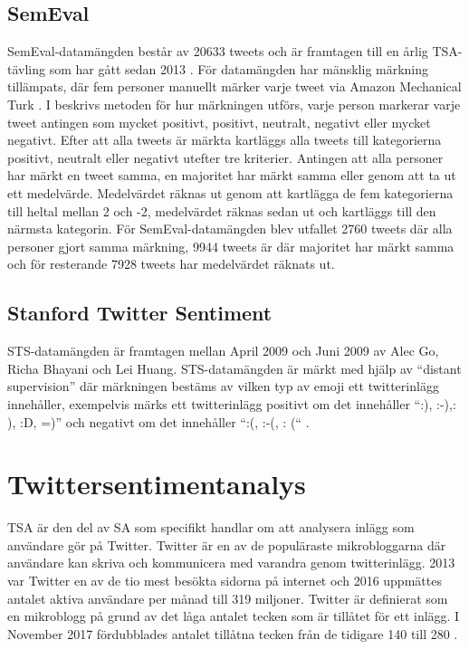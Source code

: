 \documentclass{kaumasters} %
\begin{document}
\subsection{SemEval} \label{DSse}
SemEval-datamängden består av 20633 tweets och är framtagen till en årlig TSA-tävling som har gått sedan 2013 \cite{SemEval:002}. 
För datamängden har mänsklig märkning tillämpats, där fem personer manuellt märker varje tweet via Amazon Mechanical Turk \cite{SemEval:003}.
I \cite{SemEval:004} beskrivs metoden för hur märkningen utförs, varje person markerar varje tweet antingen som mycket positivt, positivt, neutralt, negativt eller mycket negativt. Efter att alla tweets är märkta kartläggs alla tweets till kategorierna positivt, neutralt eller negativt utefter tre kriterier. Antingen att alla personer har märkt en tweet samma, en majoritet har märkt samma eller genom att ta ut ett medelvärde. Medelvärdet räknas ut genom att kartlägga de fem kategorierna till heltal mellan 2 och -2, medelvärdet räknas sedan ut och kartläggs till den närmsta kategorin. För SemEval-datamängden blev utfallet 2760 tweets där alla personer gjort samma märkning, 9944 tweets är där majoritet har märkt samma och för resterande 7928 tweets har medelvärdet räknats ut. 

\subsection{Stanford Twitter Sentiment} \label{DSsts}
STS-datamängden är framtagen mellan April 2009 och Juni 2009 av Alec Go, Richa Bhayani och Lei Huang. STS-datamängden är märkt med hjälp av “distant supervision” där märkningen bestäms av vilken typ av emoji \cite{wiki:010} ett twitterinlägg innehåller, exempelvis märks ett twitterinlägg positivt om det innehåller “:), :-),: ), :D, =)” och negativt om det innehåller “:(, :-(, : (“ \cite{sts:001}. 

\section{Twittersentimentanalys} \label{TSA}
TSA är den del av SA som specifikt handlar om att analysera inlägg som användare gör på Twitter. Twitter är en av de populäraste mikrobloggarna där användare kan skriva och kommunicera med varandra genom twitterinlägg. 2013 var Twitter en av de tio mest besökta sidorna på internet och 2016 uppmättes antalet aktiva användare per månad till 319 miljoner. Twitter är definierat som en mikroblogg på grund av det låga antalet tecken som är tillåtet för ett inlägg. I November 2017 fördubblades antalet tillåtna tecken från de tidigare 140 till 280 \cite{wiki:008}. 
\end{document}
